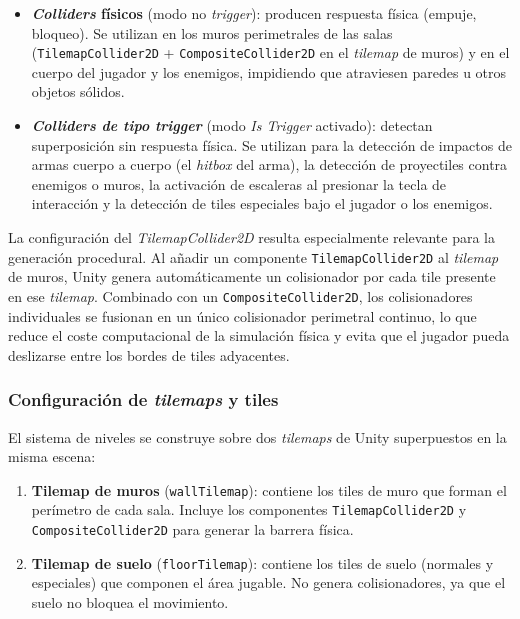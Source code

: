 \begin{itemize}
\item \textbf{\textit{Colliders} físicos} (modo no \textit{trigger}): producen respuesta física (empuje, bloqueo). Se utilizan en los muros perimetrales de las salas (\texttt{TilemapCollider2D} + \texttt{CompositeCollider2D} en el \textit{tilemap} de muros) y en el cuerpo del jugador y los enemigos, impidiendo que atraviesen paredes u otros objetos sólidos.
\item \textbf{\textit{Colliders de tipo trigger}} (modo \textit{Is Trigger} activado): detectan superposición sin respuesta física. Se utilizan para la detección de impactos de armas cuerpo a cuerpo (el \textit{hitbox} del arma), la detección de proyectiles contra enemigos o muros, la activación de escaleras al presionar la tecla de interacción y la detección de tiles especiales bajo el jugador o los enemigos.
\end{itemize}

La configuración del \textit{TilemapCollider2D} resulta especialmente relevante para la generación procedural. Al añadir un componente \texttt{TilemapCollider2D} al \textit{tilemap} de muros, Unity genera automáticamente un colisionador por cada tile presente en ese \textit{tilemap}. Combinado con un \texttt{CompositeCollider2D}, los colisionadores individuales se fusionan en un único colisionador perimetral continuo, lo que reduce el coste computacional de la simulación física y evita que el jugador pueda deslizarse entre los bordes de tiles adyacentes.

\subsubsection{Configuración de \textit{tilemaps} y tiles}


El sistema de niveles se construye sobre dos \textit{tilemaps} de Unity superpuestos en la misma escena:

\begin{enumerate}
\item \textbf{Tilemap de muros} (\texttt{wallTilemap}): contiene los tiles de muro que forman el perímetro de cada sala. Incluye los componentes \texttt{TilemapCollider2D} y \texttt{CompositeCollider2D} para generar la barrera física.
\item \textbf{Tilemap de suelo} (\texttt{floorTilemap}): contiene los tiles de suelo (normales y especiales) que componen el área jugable. No genera colisionadores, ya que el suelo no bloquea el movimiento.
\end{enumerate}

